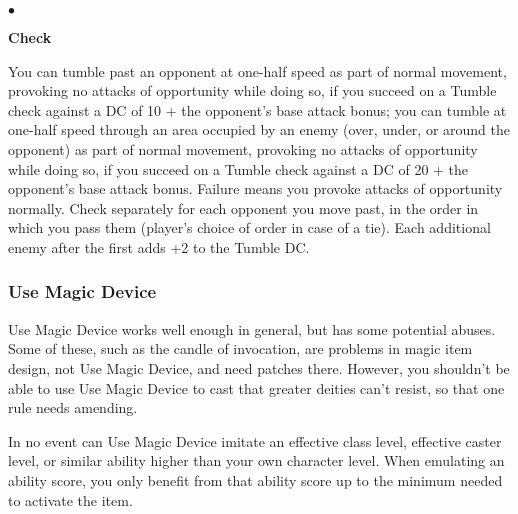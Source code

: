 \begin{list}{$\bullet$}{\itemspace}
	\item\textbf{Check}
	
	You can tumble past an opponent at one-half speed as part of normal movement, provoking no attacks of opportunity while doing so, if you succeed on a Tumble check against a DC of 10 + the opponent's base attack bonus; you can tumble at one-half speed through an area occupied by an enemy (over, under, or around the opponent) as part of normal movement, provoking no attacks of opportunity while doing so, if you succeed on a Tumble check against a DC of 20 + the opponent's base attack bonus. Failure means you provoke attacks of opportunity normally. Check separately for each opponent you move past, in the order in which you pass them (player's choice of order in case of a tie). Each additional enemy after the first adds +2 to the Tumble DC.
\end{list}

\subsubsection{Use Magic Device}

Use Magic Device works well enough in general, but has some potential abuses. Some of these, such as the candle of invocation, are problems in magic item design, not Use Magic Device, and need patches there. However, you shouldn't be able to use Use Magic Device to cast  that greater deities can't resist, so that one rule needs amending.

In no event can Use Magic Device imitate an effective class level, effective caster level, or similar ability higher than your own character level. When emulating an ability score, you only benefit from that ability score up to the minimum needed to activate the item.

